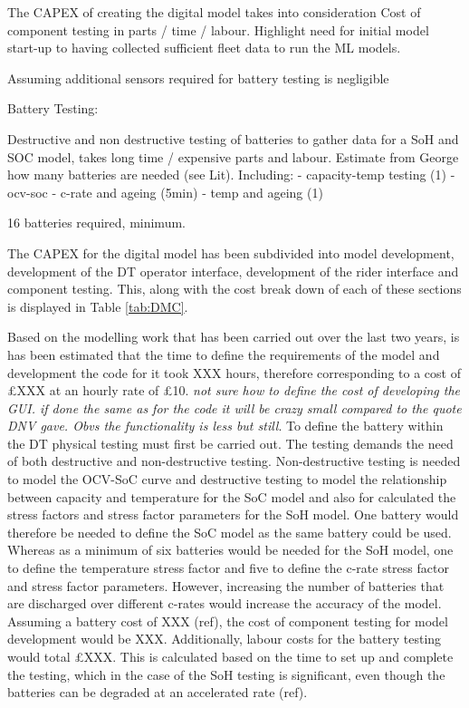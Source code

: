 \documentclass[a4paper, 10pt]{article}
\numberwithin{equation}{section}
\begin{document}
The CAPEX of creating the digital model takes into consideration
Cost of component testing in parts / time / labour. Highlight need for initial model start-up to having collected sufficient fleet data to run the ML models.

Assuming additional sensors required for battery testing is negligible 

Battery Testing:

Destructive and non destructive testing of batteries to gather data for a SoH and SOC model, takes long time / expensive parts and labour. Estimate from George how many batteries are needed (see Lit).
Including:
- capacity-temp testing (1)
- ocv-soc
- c-rate and ageing (5min)
- temp and ageing (1)


16 batteries required, minimum.

The CAPEX for the digital model has been subdivided into model development, development of the DT operator interface, development of the rider interface and component testing. This, along with the cost break down of each of these sections is displayed in Table \ref{tab:DMC}.

Based on the modelling work that has been carried out over the last two years, is has been estimated that the time to define the requirements of the model and development the code for it took XXX hours, therefore corresponding to a cost of £XXX at an hourly rate of £10. \textit{not sure how to define the cost of developing the GUI. if done the same as for the code it will be crazy small compared to the quote DNV gave. Obvs the functionality is less but still}.
To define the battery within the DT physical testing must first be carried out. The testing demands the need of both destructive and non-destructive testing. Non-destructive testing is needed to model the OCV-SoC curve and destructive testing to model the relationship between capacity and temperature for the SoC model and also for calculated the stress factors and stress factor parameters for the SoH model. One battery would therefore be needed to define the SoC model as the same battery could be used. Whereas as a minimum of six batteries would be needed for the SoH model, one to define the temperature stress factor and five to define the c-rate stress factor and stress factor parameters. However, increasing the number of batteries that are discharged over different c-rates would increase the accuracy of the model. Assuming a battery cost of XXX (ref), the cost of component testing for model development would be XXX. Additionally, labour costs for the battery testing would total £XXX. This is calculated based on the time to set up and complete the testing, which in the case of the SoH testing is significant, even though the batteries can be degraded at an accelerated rate (ref).
\end{document}
